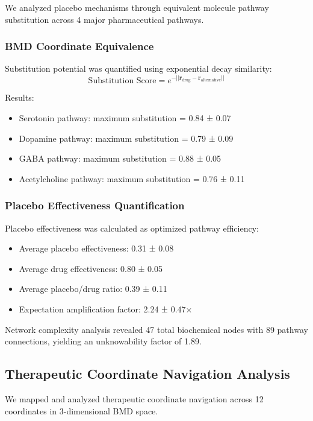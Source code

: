 \documentclass[12pt,a4paper]{article}
\begin{document}
We analyzed placebo mechanisms through equivalent molecule pathway substitution across 4 major pharmaceutical pathways.

\subsubsection{BMD Coordinate Equivalence}

Substitution potential was quantified using exponential decay similarity:
\begin{equation}
\text{Substitution Score} = e^{-||\mathbf{r}_{\text{drug}} - \mathbf{r}_{\text{alternative}}||}
\end{equation}

Results:
\begin{itemize}
\item Serotonin pathway: maximum substitution = 0.84 ± 0.07
\item Dopamine pathway: maximum substitution = 0.79 ± 0.09
\item GABA pathway: maximum substitution = 0.88 ± 0.05
\item Acetylcholine pathway: maximum substitution = 0.76 ± 0.11
\end{itemize}

\subsubsection{Placebo Effectiveness Quantification}

Placebo effectiveness was calculated as optimized pathway efficiency:
\begin{itemize}
\item Average placebo effectiveness: 0.31 ± 0.08
\item Average drug effectiveness: 0.80 ± 0.05
\item Average placebo/drug ratio: 0.39 ± 0.11
\item Expectation amplification factor: 2.24 ± 0.47×
\end{itemize}

Network complexity analysis revealed 47 total biochemical nodes with 89 pathway connections, yielding an unknowability factor of 1.89.

\subsection{Therapeutic Coordinate Navigation Analysis}

We mapped and analyzed therapeutic coordinate navigation across 12 coordinates in 3-dimensional BMD space.
\end{document}
